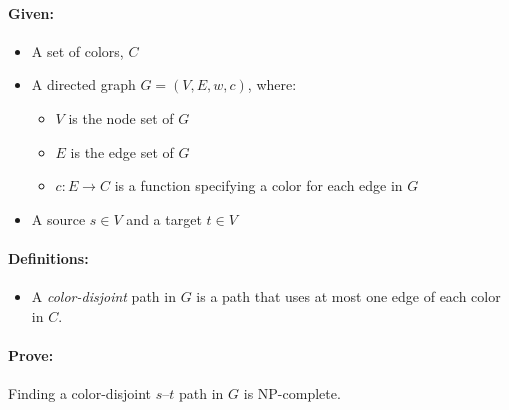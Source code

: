 \documentclass{article}
\begin{document}
  \paragraph{Given:} 
    \begin{itemize}
      \item A set of colors, $C$

      \item A directed graph $G=(V,E,w,c)$, where:
        \begin{itemize}
          \item $V$ is the node set of $G$
          \item $E$ is the edge set of $G$
          \item $c: E \rightarrow C$ is a function specifying a color
          for each edge in $G$
        \end{itemize}

      \item A source $s \in V$ and a target $t \in V$ 

    \end{itemize}

  \paragraph{Definitions:} 
    \begin{itemize}
      \item A \textit{color-disjoint} path in $G$ is a path that uses
      at most one edge of each color in $C$.
    \end{itemize}

  \paragraph{Prove:} Finding a color-disjoint $s$--$t$ path in $G$ is
  NP-complete.
\end{document}
